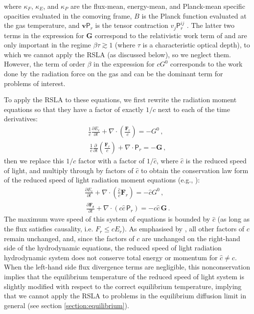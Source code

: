 \documentclass[fleqn,usenatbib]{mnras}
\newcommand{\vc}[1]{{\mathbf{#1}}}
\begin{document}
where
$\kappa_F$, $\kappa_E$, and $\kappa_P$ are the flux-mean, energy-mean, and Planck-mean specific opacities evaluated in the comoving frame,
$B$ is the Planck function evaluated at the gas temperature,
and $\vc{v} \mathsf{P}_r$ is the tensor contraction $v_j \mathsf{P}_r^{ij}$ \citep{Mihalas_1984}. The latter two terms in the expression for $\vc{G}$ correspond to the relativistic work term of \cite{Krumholz_2007} and are only important in the regime $\beta \tau \gtrsim 1$ (where $\tau$ is a characteristic optical depth), 
to which we cannot apply the RSLA (as discussed below),
so we neglect them. However, the term of order $\beta$ in the expression for $cG^0$ corresponds to the work done by the radiation force on the gas and can be the dominant term for problems of interest. 

To apply the RSLA to these equations, we first rewrite the radiation moment equations so that they have a factor of exactly $1/c$ next to each of the time derivatives:
\begin{align}
    \frac{1}{c} \frac{\partial E_r}{\partial t} + \nabla \cdot \left( \frac{\vc{F}_r}{c} \right) = -G^0 \, , \\\
    \frac{1}{c} \frac{\partial}{\partial t} \left( \frac{\vc{F}_r}{c} \right) + \nabla \cdot \mathsf{P}_r = -\vc{G} \, ,
\end{align}
then we replace this $1/c$ factor with a factor of $1/\hat c$, where $\hat c$ is the reduced speed of light, and multiply through by factors of $\hat c$ to obtain the conservation law form of the reduced speed of light radiation moment equations (e.g., \citealt{Skinner_2013}):
\begin{align}
    \frac{\partial E_r}{\partial t} + \nabla \cdot \left( \frac{\hat c}{c} \vc{F}_r \right) = -\hat c G^0 \, , \\\
    \frac{\partial \vc{F_r}}{\partial t} + \nabla \cdot (c \hat c \, \mathsf{P}_r) = -c \hat c \, \vc{G} \, .
\end{align}
The maximum wave speed of this system of equations is bounded by $\hat c$ (as long as the flux satisfies causality, i.e. $F_r \leq cE_r$). As emphasised by \cite{Skinner_2013}, all other factors of $c$ remain unchanged, and, since the factors of $c$ are unchanged on the right-hand side of the hydrodynamic equations, the reduced speed of light radiation hydrodynamic system does not conserve total energy or momentum for $\hat{c} \neq c$. 
When the left-hand side flux divergence terms are negligible, this nonconservation implies that the equilibrium temperature of the reduced speed of light system is slightly modified with respect to the correct equilibrium temperature, implying that we cannot apply the RSLA to problems in the equilibrium diffusion limit in general (see section \ref{section:equilibrium}).
\end{document}
